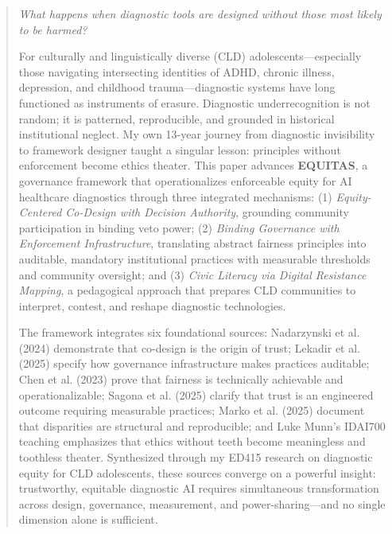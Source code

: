 \documentclass[12pt,a4paper]{article}
\begin{document}
\clearpage

\begin{abstract}

\textit{What happens when diagnostic tools are designed without those most likely to be harmed?}

For culturally and linguistically diverse (CLD) adolescents—especially those navigating intersecting identities of ADHD, chronic illness, depression, and childhood trauma—diagnostic systems have long functioned as instruments of erasure. Diagnostic underrecognition is not random; it is patterned, reproducible, and grounded in historical institutional neglect. My own 13-year journey from diagnostic invisibility to framework designer taught a singular lesson: principles without enforcement become ethics theater. This paper advances \textbf{EQUITAS}, a governance framework that operationalizes enforceable equity for AI healthcare diagnostics through three integrated mechanisms: (1) \textit{Equity-Centered Co-Design with Decision Authority}, grounding community participation in binding veto power; (2) \textit{Binding Governance with Enforcement Infrastructure}, translating abstract fairness principles into auditable, mandatory institutional practices with measurable thresholds and community oversight; and (3) \textit{Civic Literacy via Digital Resistance Mapping}, a pedagogical approach that prepares CLD communities to interpret, contest, and reshape diagnostic technologies.

\vspace{0.5em}

The framework integrates six foundational sources: Nadarzynski et al. (2024) demonstrate that co-design is the origin of trust; Lekadir et al. (2025) specify how governance infrastructure makes practices auditable; Chen et al. (2023) prove that fairness is technically achievable and operationalizable; Sagona et al. (2025) clarify that trust is an engineered outcome requiring measurable practices; Marko et al. (2025) document that disparities are structural and reproducible; and Luke Munn's IDAI700 teaching emphasizes that ethics without teeth become meaningless and toothless theater. Synthesized through my ED415 research on diagnostic equity for CLD adolescents, these sources converge on a powerful insight: trustworthy, equitable diagnostic AI requires simultaneous transformation across design, governance, measurement, and power-sharing—and no single dimension alone is sufficient.

\vspace{0.5em}


\end{abstract}
\end{document}
